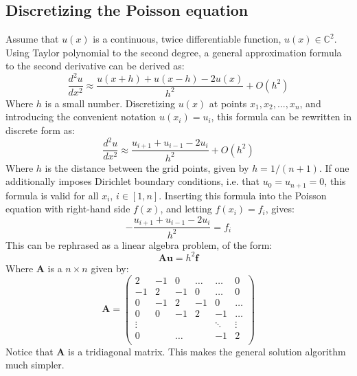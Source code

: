 \documentclass[a4paper, 10pt]{article}
\begin{document}
\subsection*{Discretizing the Poisson equation}
Assume that $u(x)$ is a continuous, twice differentiable function, $u(x) \in \mathbb{C}^2$. Using Taylor polynomial to the second degree, a general approximation formula to the second derivative can be derived as:
$$\frac{d^2 u}{dx^2}\approx \frac{u(x+h)+u(x-h)-2u(x)}{h^2}+O(h^2)$$
Where $h$ is a small number. Discretizing $u(x)$ at points $x_1, x_2, ..., x_n$, and  introducing the convenient notation $u(x_i)=u_i$, this formula can be rewritten in discrete form as:
$$\frac{d^2 u}{dx^2}\approx \frac{u_{i+1}+u_{i-1}-2u_{i}}{h^2}+O(h^2)$$
Where $h$ is the distance between the grid points, given by $h=1/(n+1)$. If one additionally imposes Dirichlet boundary conditions, i.e. that $u_0=u_{n+1}=0$, this formula is valid for all $x_i$, $i\in [1, n]$. Inserting this formula into the Poisson equation with right-hand side $f(x)$, and letting $f(x_i)=f_i$, gives:
$$-\frac{u_{i+1}+u_{i-1}-2u_{i}}{h^2}=f_i$$
This can be rephrased as a linear algebra problem, of the form:
$$\mathbf{A}\mathbf{u}=h^2\mathbf{f}$$
Where $\mathbf{A}$ is a $n \times n$ given by:
$$\mathbf{A}=\begin{pmatrix}
2 & -1 & 0 & \ldots &  \ldots & 0\\
-1 & 2 & -1  & 0 & \ldots & 0\\
0 & -1 & 2 &-1 & 0 & \ldots \\
0 & 0 & -1 & 2 &-1 &\ldots\\
\vdots &  & &  &\ddots & \vdots \\
0 && \ldots && -1&  2  \\
\end{pmatrix}$$
Notice that $\mathbf{A}$ is a tridiagonal matrix. This makes the general solution algorithm much simpler.
\end{document}
